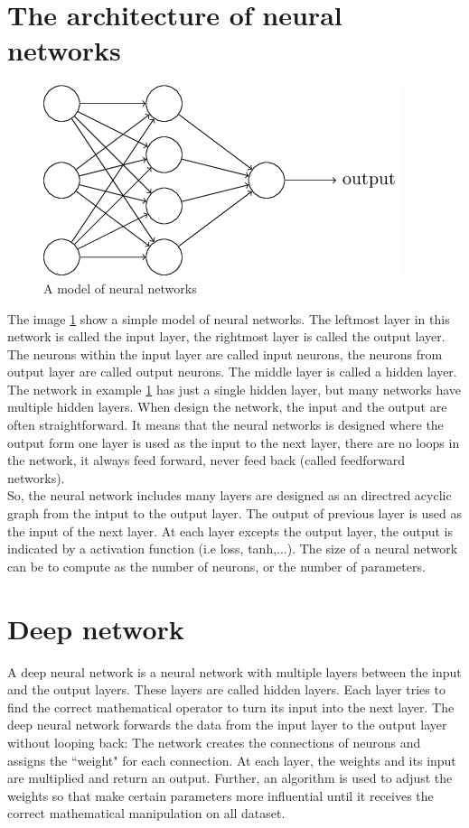 \section{The architecture of neural networks}
\begin{figure}[h]
	\centering
	\includegraphics[scale=0.5]{images/neuron}
	\caption{A model of neural networks}
	\label{fignnnetworks}
\end{figure}
The image \ref{fignnnetworks} show a simple model of neural networks. The leftmost layer in this network is called the input layer, the rightmost layer is called the output layer. The neurons within the input layer are called input neurons, the neurons from output layer are called output neurons. The middle layer is called a hidden layer. The network in example \ref{fignnnetworks} has just a single hidden layer, but many networks have multiple hidden layers. When design the network, the input and the output are often straightforward. It means that the neural networks is designed where the output form one layer is used as the input to the next layer, there are no loops in the network, it always feed forward, never feed back (called feedforward networks).\\[0.2cm]
So, the neural network includes many layers are designed as an directred acyclic graph from the intput to the output layer. The output of previous layer is used as the input of the next layer. At each layer excepts the output layer, the output is indicated by a activation function (i.e loss, tanh,...). The size of a neural network can be to compute as the number of neurons, or the number of parameters.
\section{Deep network}
A deep neural network is a neural network with multiple layers between the input and the output layers. These layers are called hidden layers. Each layer tries to find the correct mathematical operator to turn its input into the next layer. The deep neural network forwards the data from the input layer to the output layer without looping back: The network creates the connections of neurons and assigns the ``weight" for each connection. At each layer, the weights and its input are multiplied and return an output. Further, an algorithm is used to adjust the weights so that make certain parameters more influential until it receives the correct mathematical manipulation on all dataset.


